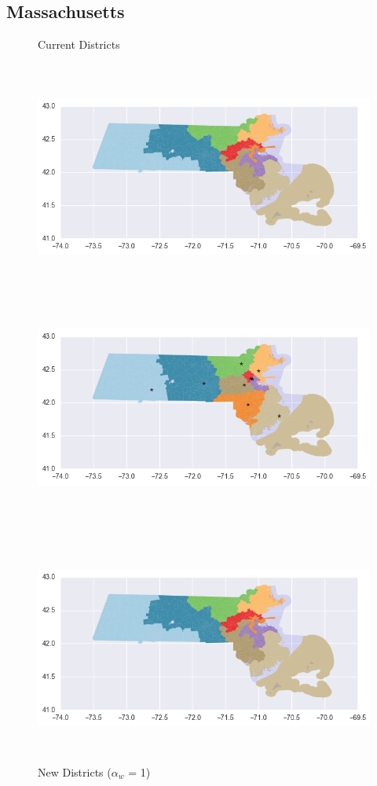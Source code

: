 \clearpage
\newpage

\subsection{Massachusetts}
\begin{figure}[htb!] \centering
\caption{ Current Districts }
\includegraphics[width=5in,height=3in,keepaspectratio]{../maps/MA/static/before.png}
\includegraphics[width=5in,height=3in,keepaspectratio]{../maps/MA/static/0_0_after.png}
\caption{ New Districts ($\alpha_w$ = 1) }
\includegraphics[width=5in,height=3in,keepaspectratio]{../maps/MA/static/before.png}

\end{figure}
